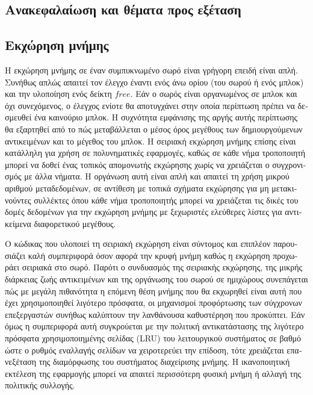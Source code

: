 \begin{greek}
\section{Ανακεφαλαίωση και θέματα προς εξέταση}
\subsection{Εκχώρηση μνήμης}
Η εκχώρηση μνήμης σε έναν συμπυκνωμένο σωρό είναι γρήγορη επειδή
είναι απλή. Συνήθως απλώς απαιτεί τον έλεγχο έναντι ενός άνω 
ορίου (του σωρού ή ενός μπλοκ) και την υλοποίηση ενός δείκτη 
$free$. Εάν ο σωρός είναι οργανωμένος σε μπλοκ και όχι συνεχόμενος,
ο έλεγχος ενίοτε θα αποτυγχάνει στην οποία περίπτωση πρέπει να
δεσμευθεί ένα καινούριο μπλοκ. Η συχνότητα εμφάνισης της αργής
αυτής περίπτωσης θα εξαρτηθεί από το πώς μεταβάλλεται ο μέσος 
όρος μεγέθους των δημιουργούμενων αντικειμένων και το μέγεθος 
του μπλοκ. Η σειριακή εκχώρηση μνήμης επίσης είναι κατάλληλη
για χρήση σε πολυνηματικές εφαρμογές, καθώς σε κάθε νήμα τροποποιητή
μπορεί να δοθεί ένας τοπικός απομονωτής εκχώρησης χωρίς να
χρειάζεται ο συγχρονισμός με άλλα νήματα. Η οργάνωση αυτή είναι
απλή και απαιτεί τη χρήση μικρού αριθμού μεταδεδομένων, σε αντίθεση
με τοπικά σχήματα εκχώρησης για μη μετακινούντες συλλέκτες όπου
κάθε νήμα τροποποιητής μπορεί να χρειάζεται τις δικές του δομές
δεδομένων για την εκχώρηση μνήμης με ξεχωριστές ελεύθερες λίστες 
για αντικείμενα διαφορετικού μεγέθους.

Ο κώδικας που υλοποιεί τη σειριακή εκχώρηση είναι σύντομος 
και επιπλέον παρουσιάζει καλή συμπεριφορά όσον αφορά την κρυφή
μνήμη καθώς η εκχώρηση προχωράει σειριακά στο σωρό. Παρότι ο
συνδυασμός της σειριακής εκχώρησης, της μικρής διάρκειας ζωής
αντικειμένων και της οργάνωσης του σωρού σε ημιχώρους συνεπάγεται
πώς με μεγάλη πιθανότητα η επόμενη θέση μνήμης που θα εκχωρηθεί
είναι αυτή που έχει χρησιμοποιηθεί λιγότερο πρόσφατα, οι μηχανισμοί
προφόρτωσης των σύγχρονων επεξεργαστών συνήθως καλύπτουν την
λανθάνουσα καθυστέρηση που προκύπτει. Εάν όμως η συμπεριφορά
αυτή συγκρούεται με την πολιτική αντικατάστασης της λιγότερο 
πρόσφατα χρησιμοποιημένης σελίδας (LRU) του λειτουργικού
συστήματος σε βαθμό ώστε ο ρυθμός εναλλαγής σελίδων να χειροτερεύει
την επίδοση, τότε χρειάζεται επανεξέταση της διαμόρφωσης του
συστήματος διαχείρισης μνήμης. Η ικανοποιητική εκτέλεση της
εφαρμογής μπορεί να απαιτεί περισσότερη φυσική μνήμη ή αλλαγή
της πολιτικής συλλογής.


\end{greek}
